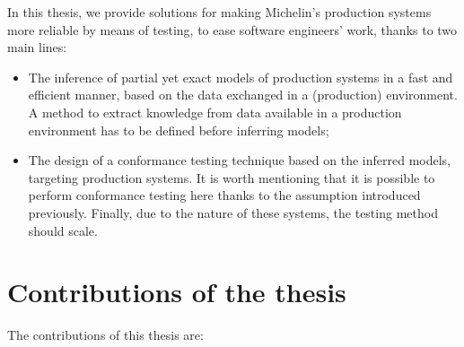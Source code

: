 In this thesis, we provide solutions for making Michelin's
production systems more reliable by means of testing, to ease
software engineers' work, thanks to two main lines:

\begin{itemize}
    \item The inference of partial yet exact models of production
        systems in a fast and efficient manner, based on the data
        exchanged in a (production) environment. A method to
        extract knowledge from data available in a production
        environment has to be defined before inferring models;

    \item The design of a conformance testing technique based on
        the inferred models, targeting production systems. It is
        worth mentioning that it is possible to perform
        conformance testing here thanks to the assumption
        introduced previously. Finally, due to the nature of
        these systems, the testing method should scale.
\end{itemize}


\section{Contributions of the thesis}
\label{sec:intro:contrib}

The contributions of this thesis are:

